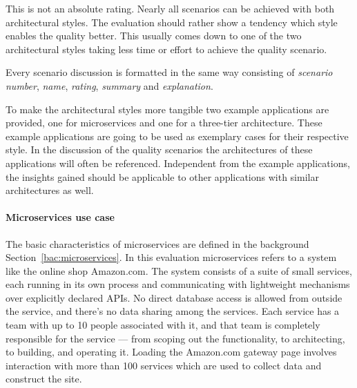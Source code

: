 This is not an absolute rating.
Nearly all scenarios can be achieved with both architectural styles.
The evaluation should rather show a tendency which style enables the quality better.
This usually comes down to one of the two architectural styles taking less time or effort to achieve the quality scenario.

Every scenario discussion is formatted in the same way consisting of 
\textit{scenario number}, \textit{name}, \textit{rating}, \textit{summary} and  \textit{explanation}.

To make the architectural styles more tangible two example applications are provided, one for microservices and one for a three-tier architecture. 
These example applications are going to be used as exemplary cases for their respective style.
In the discussion of the quality scenarios the architectures of these applications will often be referenced.
Independent from the example applications, the insights gained should be applicable to other applications with similar architectures as well.

\paragraph{Microservices use case}
The basic characteristics of microservices are defined in the background Section~\ref{bac:microservices}. In this evaluation microservices refers to a system like the online shop Amazon.com. The system consists of a suite of small services, each running in its own process and communicating with lightweight mechanisms over explicitly declared \ac{API}s. No direct database access is allowed from outside the service, and there's no data sharing among the services. Each service has a team with up to 10 people associated with it, and that team is completely responsible for the service — from scoping out the functionality, to architecting, to building, and operating it. 
Loading the Amazon.com gateway page involves interaction with more than 100 services which are used to collect data and construct the site. \cite{Vogels2006}

